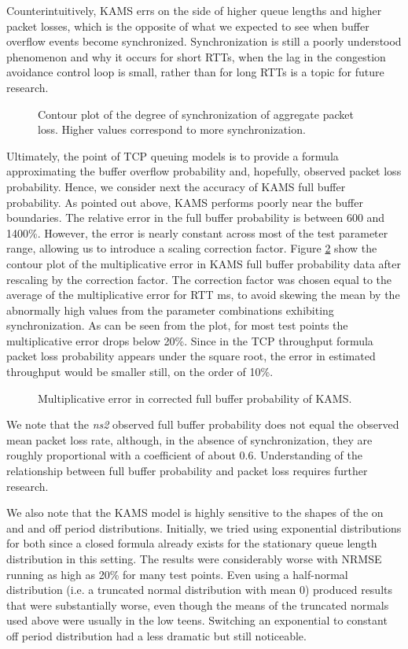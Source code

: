 \documentclass{IEEEtran}[10pt,letterpaper,conference]
\begin{document}
Counterintuitively, KAMS errs on the side of higher queue lengths and higher packet losses, which is the opposite of what we expected to see when buffer overflow events become synchronized. Synchronization is still a poorly understood phenomenon and why it occurs for short RTTs, when the lag in the congestion avoidance control loop is small, rather than for long RTTs is a topic for future research.
\begin{figure}[ht]
\caption{Contour plot of the degree of synchronization of aggregate packet loss. Higher values correspond to more synchronization.}
\label{sync}
\end{figure}

Ultimately, the point of TCP queuing models is to provide a formula approximating the buffer overflow probability and, hopefully, observed packet loss probability. Hence, we consider next the accuracy of KAMS full buffer probability. As pointed out above, KAMS performs poorly near the buffer boundaries. The relative error in the full buffer probability is between 600 and 1400\%. However, the error is nearly constant across most of the test parameter range, allowing us to introduce a scaling correction factor. Figure \ref{full_buffer_error} show the contour plot of the multiplicative error in KAMS full buffer probability data after rescaling by the correction factor. The correction factor was chosen equal to the average of the multiplicative error for RTT ms, to avoid skewing the mean by the abnormally high values from the parameter combinations exhibiting synchronization. As can be seen from the plot, for most test points the multiplicative error drops below 20\%. Since in the TCP throughput formula packet loss probability appears under the square root, the error in estimated throughput would be smaller still, on the order of 10\%.
\begin{figure}[ht]
\caption{Multiplicative error in corrected full buffer probability of KAMS.}
\label{full_buffer_error}
\end{figure}

We note that the \emph{ns2} observed full buffer probability does not equal the observed mean packet loss rate, although, in the absence of synchronization, they are roughly proportional with a coefficient of about 0.6. Understanding of the relationship between full buffer probability and packet loss requires further research.

We also note that the KAMS model is highly sensitive to the shapes of the on and and off period distributions. Initially, we tried using exponential distributions for both since a closed formula already exists for the stationary queue length distribution in this setting. The results were considerably worse with NRMSE running as high as 20\% for many test points. Even using a half-normal distribution (i.e. a truncated normal distribution with mean 0) produced results that were substantially worse, even though the means of the truncated normals used above were usually in the low teens. Switching an exponential to constant off period distribution had a less dramatic but still noticeable.
\end{document}
